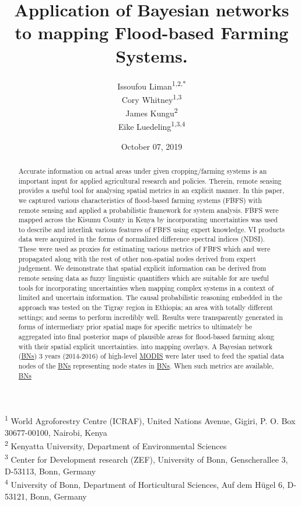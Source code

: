 \documentclass[12pt,oneside]{article}
\title{Application of Bayesian networks to mapping Flood-based Farming Systems.}
\author{Issoufou Liman\textsuperscript{1,2,*} \\ Cory Whitney\textsuperscript{1,3} \\ James Kungu\textsuperscript{2} \\ Eike Luedeling\textsuperscript{1,3,4}}
\date{October 07, 2019}
\begin{document}
\maketitle
\begin{abstract}
Accurate information on actual areas under given cropping/farming systems is an important input for applied agricultural research and policies. Therein, remote sensing provides a useful tool for analysing spatial metrics in an explicit manner. In this paper, we captured various characteristics of flood-based farming systems (FBFS) with remote sensing and applied a probabilistic framework for system analysis. FBFS were mapped across the Kisumu County in Kenya by incorporating uncertainties was used to describe and interlink various features of FBFS using expert knowledge. VI products data were acquired in the forms of normalized difference spectral indices (NDSI). These were used as proxies for estimating various metrics of FBFS which and were propagated along with the rest of other non-spatial nodes derived from expert judgement. We demonstrate that spatial explicit information can be derived from remote sensing data as fuzzy linguistic quantifiers which are suitable for are useful tools for incorporating uncertainties when mapping complex systems in a context of limited and uncertain information. The causal probabilistic reasoning embedded in the approach was tested on the Tigray region in Ethiopia; an area with totally different settings; and seems to perform incredibly well. Results were transparently generated in forms of intermediary prior spatial maps for specific metrics to ultimately be aggregated into final posterior maps of plausible areas for flood-based farming along with their spatial explicit uncertainties. into mapping overlays. A Bayesian network (\href{https://en.wikipedia.org/wiki/Bayesian_network}{BNs}) 3 years (2014-2016) of high-level \href{https://terra.nasa.gov/about/terra-instruments/modis}{MODIS} were later used to feed the spatial data nodes of the \href{https://en.wikipedia.org/wiki/Bayesian_network}{BNs} representing node states in \href{https://en.wikipedia.org/wiki/Bayesian_network}{BNs}. When such metrics are available, \href{https://en.wikipedia.org/wiki/Bayesian_network}{BNs}
\end{abstract}

{
\hypersetup{linkcolor=black}
\setcounter{tocdepth}{5}
\tableofcontents
}
\textsuperscript{1} World Agroforestry Centre (ICRAF), United Nations Avenue, Gigiri, P. O. Box 30677-00100, Nairobi, Kenya\\
\textsuperscript{2} Kenyatta University, Department of Environmental Sciences\\
\textsuperscript{3} Center for Development research (ZEF), University of Bonn, Genscherallee 3, D-53113, Bonn, Germany\\
\textsuperscript{4} University of Bonn, Department of Horticultural Sciences, Auf dem Hügel 6, D-53121, Bonn, Germany
\end{document}
